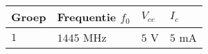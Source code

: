 
 \begin{tabular}{|l|l|l|l|} 
\hline \textbf{Groep} & \textbf{Frequentie $f_0$} & \textbf{$V_{ce}$} & \textbf{$I_c$}\\ 
\hline $1$ & $1445$ MHz & $5$ V & $5$ mA \\ 
\hline \end{tabular} 
